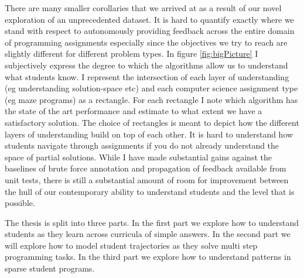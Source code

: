 There are many smaller corollaries that we arrived at as a result of our novel exploration of an unprecedented dataset. It is hard to quantify exactly where we stand with respect to autonomously providing feedback across the entire domain of programming assignments especially since the objectives we try to reach are slightly different for different problem types. In figure \ref{fig:bigPicture} I subjectively express the degree to which the algorithms allow us to understand what students know. I represent the intersection of each layer of understanding (eg understanding solution-space etc) and each computer science assignment type (eg maze programs) as a rectangle. For each rectangle I note which algorithm has the state of the art performance and estimate to what extent we have a satisfactory solution. The choice of rectangles is meant to depict how the different layers of understanding build on top of each other. It is hard to understand how students navigate through assignments if you do not already understand the space of partial solutions. While I have made substantial gains against the baselines of brute force annotation and propagation of feedback available from unit tests, there is still a substantial amount of room for improvement between the hull of our contemporary ability to understand students and the level that is possible.

The thesis is split into three parts. In the first part we explore how to understand students as they learn across curricula of simple answers. In the second part we will explore how to model student trajectories as they solve multi step programming tasks. In the third part we explore how to understand patterns in sparse student programs.






